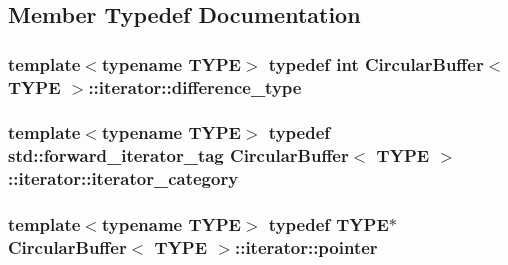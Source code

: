 \subsection{Member Typedef Documentation}
\subsubsection[{\texorpdfstring{difference\+\_\+type}{difference_type}}]{\setlength{\rightskip}{0pt plus 5cm}template$<$typename T\+Y\+PE$>$ typedef int {\bf Circular\+Buffer}$<$ T\+Y\+PE $>$\+::{\bf iterator\+::difference\+\_\+type}}\hypertarget{classCircularBuffer_1_1iterator_a58a96b782e1e3ccef78445b819e8011a}{}\label{classCircularBuffer_1_1iterator_a58a96b782e1e3ccef78445b819e8011a}
\subsubsection[{\texorpdfstring{iterator\+\_\+category}{iterator_category}}]{\setlength{\rightskip}{0pt plus 5cm}template$<$typename T\+Y\+PE$>$ typedef std\+::forward\+\_\+iterator\+\_\+tag {\bf Circular\+Buffer}$<$ T\+Y\+PE $>$\+::{\bf iterator\+::iterator\+\_\+category}}\hypertarget{classCircularBuffer_1_1iterator_a806f5db087c9419cb1f81c030f39267c}{}\label{classCircularBuffer_1_1iterator_a806f5db087c9419cb1f81c030f39267c}
\subsubsection[{\texorpdfstring{pointer}{pointer}}]{\setlength{\rightskip}{0pt plus 5cm}template$<$typename T\+Y\+PE$>$ typedef T\+Y\+PE$\ast$ {\bf Circular\+Buffer}$<$ T\+Y\+PE $>$\+::{\bf iterator\+::pointer}}\hypertarget{classCircularBuffer_1_1iterator_a35ab71bca3df750e955de46c222b8ee3}{}\label{classCircularBuffer_1_1iterator_a35ab71bca3df750e955de46c222b8ee3}
